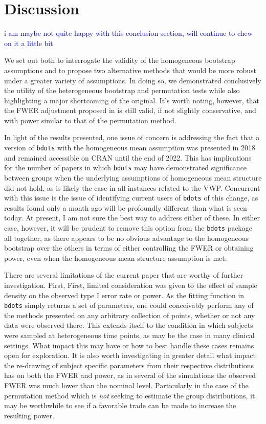 \documentclass{article}
\newcommand{\xt}{\texttt}
\providecommand{\cn}[1]{\textcolor{blue}{#1}}
\begin{document}
\section{Discussion}

\cn{i am maybe not quite happy with this conclusion section, will continue to chew on it a little bit}

We set out both to interrogate the validity of the homogeneous bootstrap assumptions and to propose two alternative methods that would be more robust under a greater variety of assumptions. In doing so, we demonstrated conclusively the utility of the heterogeneous bootstrap and permutation tests while also highlighting a major shortcoming of the original. It's worth noting, however, that the FWER adjustment proposed in \cite{oleson2017detecting} is still valid, if not slightly conservative, and with power similar to that of the permutation method. 

In light of the results presented, one issue of concern is addressing the fact that a version of \xt{bdots} with the homogeneous mean assumption was presented in 2018 and remained accessible on CRAN until the end of 2022. This has implications for the number of papers in which \xt{bdots} may have demonstrated significance between groups when the underlying assumptions of homogeneous mean structure did not hold, as is likely the case in all instances related to the VWP. Concurrent with this issue is the issue of identifying current users of \xt{bdots} of this change, as results found only a month ago will be profoundly different than what is seen today. At present, I am not sure the best way to address either of these. In either case, however, it will be prudent to remove this option from the \xt{bdots} package all together, as there appears to be no obvious advantage to the homogeneous bootstrap over the others in terms of either controlling the FWER or obtaining power, even when the homogeneous mean structure assumption is met.

There are several limitations of the current paper that are worthy of further investigation. First, First, limited consideration was given to the effect of sample density on the observed type I error rate or power. As the fitting function in \xt{bdots} simply returns a set of parameters, one could conceivably perform any of the methods presented on any arbitrary collection of points, whether or not any data were observed there. This extends itself to the condition in which subjects were sampled at heterogeneous time points, as may be the case in many clinical settings. What impact this may have or how to best handle these cases remains open for exploration. It is also worth investigating in greater detail what impact the re-drawing of subject specific parameters from their respective distributions has on both the FWER and power, as in several of the simulations the observed FWER was much lower than the nominal level. Particularly in the case of the permutation method which is \textit{not} seeking to estimate the group distributions, it may be worthwhile to see if a favorable trade can be made to increase the resulting power.
\end{document}
